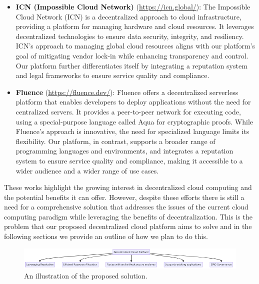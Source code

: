 \begin{itemize}
    \item {\bf ICN (Impossible Cloud Network)} (\url{https://icn.global/}): The Impossible Cloud Network (ICN) is a decentralized approach to cloud infrastructure, providing a platform for managing hardware and cloud resources. It leverages decentralized technologies to ensure data security, integrity, and resiliency. ICN's approach to managing global cloud resources aligns with our platform's goal of mitigating vendor lock-in while enhancing transparency and control. Our platform further differentiates itself by integrating a reputation system and legal frameworks to ensure service quality and compliance.

    \item {\bf Fluence} (\url{https://fluence.dev/}): Fluence offers a decentralized serverless platform that enables developers to deploy applications without the need for centralized servers. It provides a peer-to-peer network for executing code, using a special-purpose language called Aqua for cryptographic proofs. While Fluence's approach is innovative, the need for specialized language limits its flexibility. Our platform, in contrast, supports a broader range of programming languages and environments, and integrates a reputation system to ensure service quality and compliance, making it accessible to a wider audience and a wider range of use cases.
\end{itemize}

These works highlight the growing interest in decentralized cloud computing and the potential benefits it can offer.
However, despite these efforts there is still a need for a comprehensive solution that addresses the issues of the current cloud computing paradigm while leveraging the benefits of decentralization. This is the problem that our proposed decentralized cloud platform aims to solve and in the following sections we provide an outline of how we plan to do this.

\begin{figure}[ht]
    \centering
    \includegraphics[width=\textwidth]{figures/proposed-solution.png}
    \caption{An illustration of the proposed solution.}
\end{figure}
